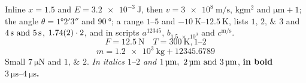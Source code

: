 \documentclass{article}
\begin{document}
Inline $x = \num{1.5}$ and $E = \qty{3.2e-3}{\joule}$, then $v=\SI{3e8}{\metre\per\second}$,
$\si{\kilo\gram\metre\squared}$ and $\unit{\micro\metre}+1$; the angle $\theta=\ang{1;2;3}$ and
$\qty{90}{\degree}$; a range $\numrange{1}{5}$ and $\qtyrange{-10}{12.5}{\kelvin}$, lists
$\numlist{1;2;3}$ and $\SIlist{4;5}{\second}$, $\num{1.74 \pm 0.02}\cdot 2$, and in scripts
$a^{\num{12345}}$, $b_{\num{1.5e3}}$ and $c^{\si{\metre\per\second}}$.
\[ F = \qty{12.5}{\newton} \quad T = \SI{300}{\kelvin}, \numrange{1}{2} \]
\begin{equation}
  m = \qty{1.2e3}{\kilo\gram} + \num{12345.6789}
\end{equation}
{\small Small $\qty{7}{\micro\newton}$ and $\numlist{1;2}$.} \emph{In italics $\numrange{1}{2}$ and
$\SIlist{1;2;3}{\micro\metre}$}, \textbf{in bold $\qtyrange{3}{4}{\micro\second}$.}
\end{document}
